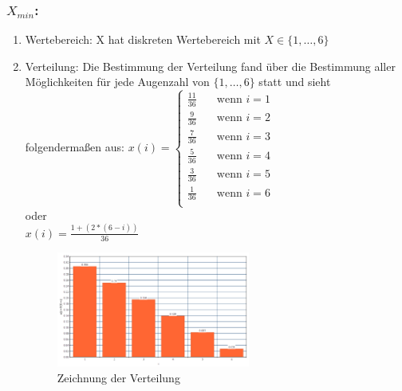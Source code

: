 \documentclass[%
10pt,              %
ngerman,           %
a4paper,           %
DIV11,             %
]{scrartcl}%
\begin{document}
\subsubsection*{$X_{min}$:}

\begin{enumerate}
	\item Wertebereich: X hat diskreten Wertebereich mit $X \in \{1, \dots, 6 \}$
	\item Verteilung: Die Bestimmung der Verteilung fand über die Bestimmung aller Möglichkeiten für jede Augenzahl von $\{1, \dots, 6 \}$ statt und sieht folgendermaßen aus:\newline
	$x(i) = 
    \begin{cases}
        \frac{11}{36} & \quad \text{wenn } i = 1\\
        \frac{9}{36} & \quad \text{wenn } i = 2\\
        \frac{7}{36} & \quad \text{wenn } i = 3\\
        \frac{5}{36} & \quad \text{wenn } i = 4\\
        \frac{3}{36} & \quad \text{wenn } i = 5\\
        \frac{1}{36} & \quad \text{wenn } i = 6\\
    \end{cases}$
    \\
    oder
    \\
    $x(i) = \frac{1 + (2 * (6 - i))}{36}$
    \\
     
    \begin{figure}[!htbp]
      \centering
        \caption{Zeichnung der Verteilung}
        \includegraphics[width=0.6\textwidth]{xminvert}
    \end{figure}
	

\end{enumerate}
\end{document}
